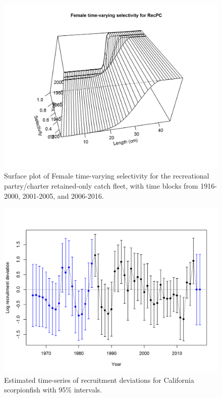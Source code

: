 \documentclass[12pt,]{article}
\begin{document}
\begin{figure}[htbp]
\centering
\includegraphics{r4ss/plots_mod1/sel03_len_timevary_surf_flt5sex1.png}
\caption{Surface plot of Female time-varying selectivity for the
recreational partry/charter retained-only catch fleet, with time blocks
from 1916-2000, 2001-2005, and 2006-2016.
\label{fig:sel03_len_timevary_surf_flt5sex1}}
\end{figure}

\FloatBarrier

\begin{figure}[htbp]
\centering
\includegraphics{r4ss/plots_mod1/recdevs2_withbars.png}
\caption{Estimated time-series of recruitment deviations for California
scorpionfish with 95\% intervals. \label{fig:recdevs2_withbars}}
\end{figure}
\end{document}
